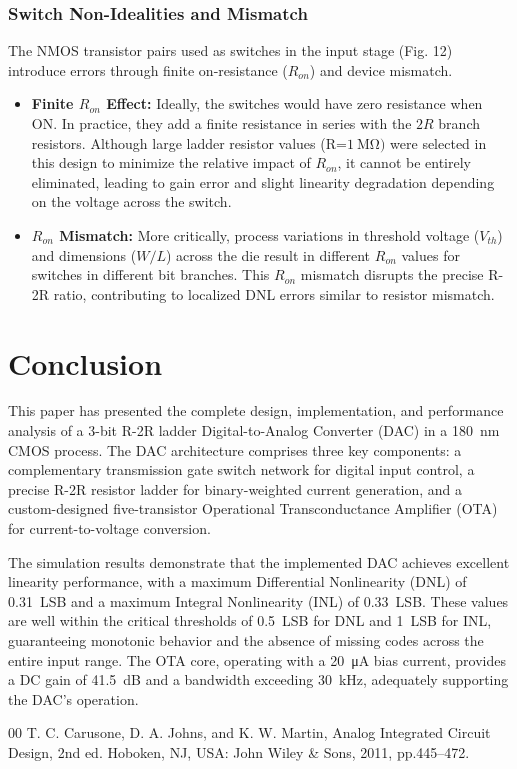 \documentclass[conference]{IEEEtran}
\begin{document}
\subsubsection{Switch Non-Idealities and Mismatch}  
The NMOS transistor pairs used as switches in the input stage (Fig. 12) introduce errors through finite on-resistance ($R_{on}$) and device mismatch.  
\begin{itemize}  
    \item \textbf{Finite $R_{on}$ Effect:} Ideally, the switches would have zero resistance when ON. In practice, they add a finite resistance in series with the $2R$ branch resistors. Although large ladder resistor values (R=$\SI{1}{\mega\ohm})$ were selected in this design to minimize the relative impact of $R_{on}$, it cannot be entirely eliminated, leading to gain error and slight linearity degradation depending on the voltage across the switch.  
    \item \textbf{$R_{on}$ Mismatch:} More critically, process variations in threshold voltage ($V_{th}$) and dimensions ($W/L$) across the die result in different $R_{on}$ values for switches in different bit branches. This $R_{on}$ mismatch disrupts the precise R-2R ratio, contributing to localized DNL errors similar to resistor mismatch.  
\end{itemize}  
  

\section{Conclusion}

This paper has presented the complete design, implementation, and performance analysis of a 3-bit R-2R ladder Digital-to-Analog Converter (DAC) in a \SI{180}{\nano\meter} CMOS process. The DAC architecture comprises three key components: a complementary transmission gate switch network for digital input control, a precise R-2R resistor ladder for binary-weighted current generation, and a custom-designed five-transistor Operational Transconductance Amplifier (OTA) for current-to-voltage conversion.

The simulation results demonstrate that the implemented DAC achieves excellent linearity performance, with a maximum Differential Nonlinearity (DNL) of \SI{0.31}{LSB} and a maximum Integral Nonlinearity (INL) of \SI{0.33}{LSB}. These values are well within the critical thresholds of \SI{0.5}{LSB} for DNL and \SI{1}{LSB} for INL, guaranteeing monotonic behavior and the absence of missing codes across the entire input range. The OTA core, operating with a \SI{20}{\micro\ampere} bias current, provides a DC gain of \SI{41.5}{\deci\bel} and a bandwidth exceeding \SI{30}{\kilo\hertz}, adequately supporting the DAC's operation.


\begin{thebibliography}{00}
 T. C. Carusone, D. A. Johns, and K. W. Martin, Analog Integrated Circuit Design, 2nd ed. Hoboken, NJ, USA: John Wiley \& Sons, 2011, pp.445--472.
\end{thebibliography}
\end{document}
